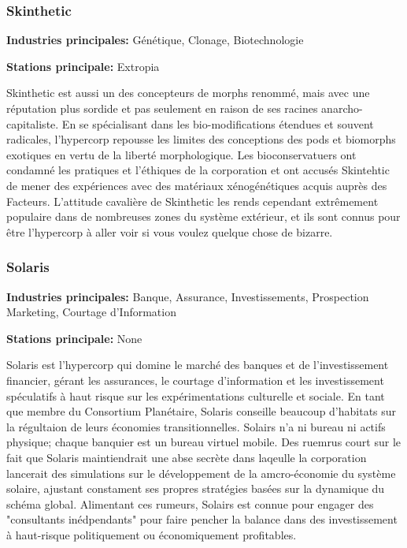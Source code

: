                         \subsubsection{Skinthetic} \label{sec:skinthetic} 

                        \textbf{Industries principales:} Génétique, Clonage, Biotechnologie 

                        \textbf{Stations principale:} Extropia 

                        Skinthetic est aussi un des concepteurs de morphs renommé, mais avec une réputation plus sordide et pas seulement en raison de ses racines anarcho-capitaliste. En se spécialisant dans les bio-modifications étendues et souvent radicales, l'hypercorp repousse les limites des conceptions des pods et biomorphs exotiques en vertu de la liberté morphologique. Les bioconservatuers ont condamné les pratiques et l'éthiques de la corporation et ont accusés Skintehtic de mener des expériences avec des matériaux xénogénétiques acquis auprès des Facteurs. L'attitude cavalière de Skinthetic les rends cependant extrêmement populaire dans de nombreuses zones du système extérieur, et ils sont connus pour être l'hypercorp à aller voir si vous voulez quelque chose de bizarre. 

                        \subsubsection{Solaris} \label{sec:solaris} 

                        \textbf{Industries principales:} Banque, Assurance, Investissements, Prospection Marketing, Courtage d'Information 

                        \textbf{Stations principale:} None 

                        Solaris est l'hypercorp qui domine le marché des banques et de l'investissement financier, gérant les assurances, le courtage d'information et les investissement spéculatifs à haut risque sur les expérimentations culturelle et sociale. En tant que membre du Consortium Planétaire, Solaris conseille beaucoup d'habitats sur la régultaion de leurs économies transitionnelles. Solairs n'a ni bureau ni actifs physique; chaque banquier est un bureau virtuel mobile. Des ruemrus court sur le fait que Solaris maintiendrait une abse secrète dans laqeulle la corporation lancerait des simulations sur le développement de la amcro-économie du système solaire, ajustant constament ses propres stratégies basées sur la dynamique du schéma global. Alimentant ces rumeurs, Solairs est connue pour engager des "consultants inédpendants" pour faire pencher la balance dans des investissement à haut-risque politiquement ou économiquement profitables. 

